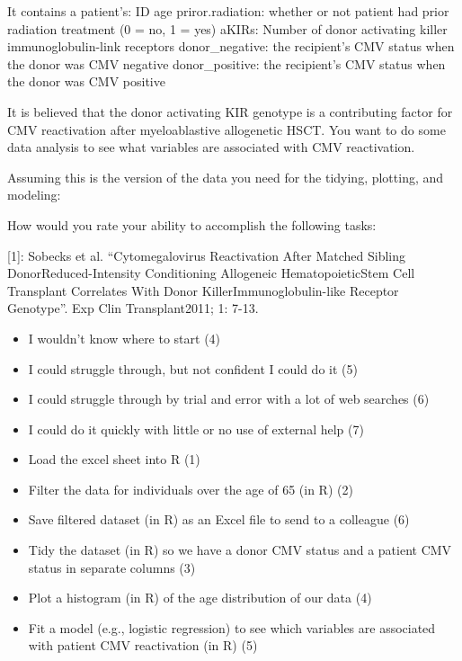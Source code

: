 \documentclass[030-workshop.tex]{subfiles}
\begin{document}
    It contains a patient's: ID age priror.radiation: whether or not patient had
    prior radiation treatment (0 = no, 1 = yes) aKIRs: Number of donor activating
    killer immunoglobulin-link receptors donor\_negative: the recipient's CMV status
    when the donor was CMV negative donor\_positive: the recipient's CMV status when
    the donor was CMV positive

    It is believed that the donor activating KIR genotype is a contributing factor
    for CMV reactivation after myeloablastive allogenetic HSCT. You want to do some
    data analysis to see what variables are associated with CMV reactivation.

    Assuming this is the version of the data you need for the tidying, plotting, and
    modeling:

    How would you rate your ability to accomplish the following tasks:

    [1]: Sobecks et al. “Cytomegalovirus Reactivation After Matched Sibling
    DonorReduced-Intensity Conditioning Allogeneic HematopoieticStem Cell Transplant
    Correlates With Donor KillerImmunoglobulin-like Receptor Genotype”. Exp Clin
    Transplant2011; 1: 7-13.

    \begin{itemize}
        \item I wouldn’t know where to start (4)
        \item I could struggle through, but not confident I could do it (5)
        \item I could struggle through by trial and error with a lot of web searches (6)
        \item I could do it quickly with little or no use of external help (7)
    \end{itemize}

    \begin{itemize}
        \item Load the excel sheet into R (1)
        \item Filter the data for individuals over the age of 65 (in R) (2)
        \item Save filtered dataset (in R) as an Excel file to send to a colleague (6)
        \item Tidy the dataset (in R) so we have a donor CMV status and a patient CMV status in separate columns (3)
        \item Plot a histogram (in R) of the age distribution of our data (4)
        \item Fit a model (e.g., logistic regression) to see which variables are associated with patient CMV reactivation  (in R) (5)
    \end{itemize}
\end{document}
